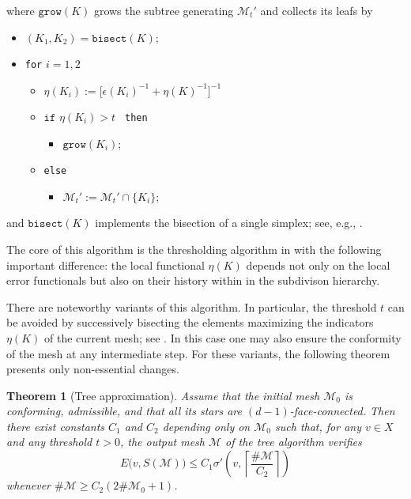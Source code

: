 \documentclass[a4paper]{amsart}
\numberwithin{equation}{section}
\theoremstyle{plain}
\newtheorem{thm}{Theorem}[section]
\theoremstyle{definition}
\begin{document}
\smallskip\noindent
where $\texttt{grow}({K})$ grows the subtree generating ${\mathcal{M}}_t'$ and 
collects its leafs by

\smallskip\noindent
\begin{itemize}
 \item[] $({K}_1,{K}_2)=\texttt{bisect}({K})$;
 \item[] \texttt{for} $i=1,2$
 \begin{itemize}
  \item[] $\eta({K}_i) {:=} \big[
      {\epsilon}({K}_i)^{-1} + \eta({K})^{-1} 
    \big]^{-1}$
  \item[] $\texttt{if } \eta({K}_i)>t$ \texttt{ then}
  \begin{itemize}
   \item[] $\texttt{grow}({K}_i)$;
  \end{itemize}
  \item[] \texttt{else}
  \begin{itemize}
   \item[] ${\mathcal{M}}_t' {:=} {\mathcal{M}}_t' \cap \{{K}_i\}$; 
  \end{itemize}
 \end{itemize}
\end{itemize}

\smallskip\noindent
and $\texttt{bisect}({K})$ implements the bisection of a single simplex; 
see, e.g., \cite[\S4.1]{Nochetto.Siebert.Veeser:09}.

The core of this algorithm is the thresholding algorithm in 
\cite{Birman.Solomyak:67} with the following important difference: the 
local functional $\eta({K})$ depends not only on the local error functionals 
but also on their history within in the subdivison hierarchy.

There are noteworthy variants of this algorithm.  In particular, the threshold 
$t$ can be avoided by successively bisecting the elements maximizing the 
indicators $\eta({K})$ of the current mesh; see \cite{Binev.DeVore:04}.  In 
this case one may also ensure the conformity of the mesh at any intermediate 
step.  For these variants, the following theorem presents only non-essential 
changes.

\begin{thm}[Tree approximation]
\label{T:tree-approx}
Assume that the initial mesh ${\mathcal{M}}_0$ is conforming, admissible, and that 
all its stars are $(d-1)$-face-connected.  Then there exist constants $C_1$ 
and $C_2$ depending only on ${\mathcal{M}}_0$ such that, for any $v\in X$ and any 
threshold $t>0$, the output mesh ${\mathcal{M}}$ of the tree algorithm verifies
\[
 E\big( v,{S}({\mathcal{M}}) \big)
 \leq
 C_1 \sigma' \left( v, \left\lceil \frac{\#{\mathcal{M}}}{C_2} \right\rceil \right)
\]
whenever $\#{\mathcal{M}}\geq C_2(2\#{\mathcal{M}}_0+1)$.
\end{thm}
\end{document}
